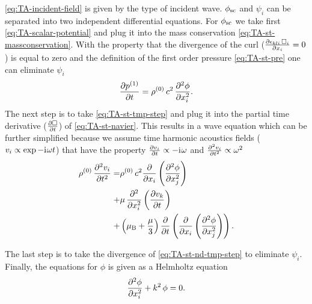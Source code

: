 \cref{eq:TA-incident-field} is given by the type of incident wave. 
$\phi_{\mathrm{sc}}$ and $\psi_{i}$ can be separated into two independent 
differential equations. For $\phi_{\mathrm{sc}}$ we take first 
\cref{eq:TA-scalar-potential} and plug it into the mass conservation 
\cref{eq:TA-st-massconservation}. With the property that the divergence of the 
curl ($\pdv{\epsilon_{kli}\,\Box_{i}}{x_{i}} = 0$) is equal to zero and the 
definition of the first order pressure \cref{eq:TA-st-pre} one can eliminate 
$\psi_{i}$
\begin{equation}
  \pdv{  p^{(1)}  }{t} = \rho^{(0)}\,c^{2}\,\pdv[2]{\phi}{x_{i}}.
  \label{eq:TA-st-tmp-step}
\end{equation}
The next step is to take \cref{eq:TA-st-tmp-step} and plug it into the partial 
time derivative ($\pdv{\Box}{t}$) of \cref{eq:TA-st-navier}. This results in a 
wave equation which can be further simplified because we assume time harmonic 
acoustics fields ($v_{i}\propto\exp -\mathrm{i}\mkern1mu\omega t$) that have the property 
$\pdv{v_{i}}{t}\propto -\mathrm{i}\mkern1mu\omega$ and
$\pdv[2]{v_{i}}{t}\propto \omega^{2}$
\begin{equation}
  \label{eq:TA-st-nd-tmp-step}
\begin{split}
  \rho^{(0)}\,\pdv[2]{v_{i}}{t} = & 
  \rho^{(0)}\,c^{2}\pdv{x_{i}}\left( \pdv[2]{\phi}{x_{j}} \right) \\
  + & \mu\,\pdv[2]{x_{i}}\left( \pdv{v_{k}}{t} \right) \\
    + & \left(\mu_{\mathrm{B}} + \frac{\mu}{3}\right)\pdv{t}
    \left( \pdv{x_{i}}\left( \pdv[2]{\phi}{x_{j}} \right) \right).
\end{split}
\end{equation}

The last step is to take the divergence of \cref{eq:TA-st-nd-tmp-step} to 
eliminate $\psi_{i}$. Finally, the equations for $\phi$ is given as a Helmholtz 
equation
\begin{equation}
  \pdv[2]{\phi}{x_{i}} + k^{2}\,\phi = 0.
  \label{eq:TA-st-phi}
\end{equation}

